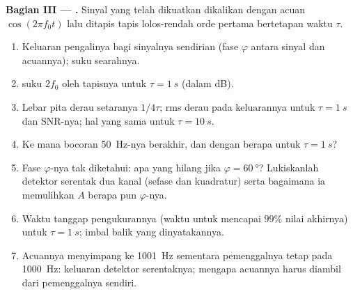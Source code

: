 \begin{problem}
\medskip
\noindent\textbf{Bagian III --- .}
Sinyal yang telah dikuatkan dikalikan dengan acuan $\cos(2\pi f_0t)$
lalu ditapis tapis lolos-rendah orde pertama bertetapan waktu $\tau$.
\begin{enumerate}[resume]
  \item Keluaran pengalinya bagi sinyalnya sendirian (fase $\varphi$
        antara sinyal dan acuannya); suku searahnya.
  \item {} suku $2f_0$ oleh tapisnya untuk $\tau = \qty{1}{s}$
        (dalam dB).
  \item Lebar pita derau setaranya $1/4\tau$; rms derau pada keluarannya
        untuk $\tau = \qty{1}{s}$ dan SNR-nya; hal yang sama untuk $\tau = \qty{10}{s}$.
  \item Ke mana bocoran \qty{50}{Hz}-nya berakhir, dan dengan
         berapa untuk $\tau = \qty{1}{s}$?
  \item Fase $\varphi$-nya tak diketahui: apa yang hilang jika $\varphi = \qty{60}{\degree}$?
        Lukiskanlah detektor serentak dua kanal (sefase dan kuadratur) serta
        bagaimana ia memulihkan $A$ berapa pun $\varphi$-nya.
  \item Waktu tanggap pengukurannya (waktu untuk mencapai $99\%$ nilai
        akhirnya) untuk $\tau = \qty{1}{s}$; imbal balik yang dinyatakannya.
  \item Acuannya menyimpang ke \qty{1001}{Hz} sementara pemenggalnya tetap pada
        \qty{1000}{Hz}: keluaran detektor serentaknya; mengapa acuannya harus
        diambil dari pemenggalnya sendiri.
\end{enumerate}


\end{problem}

